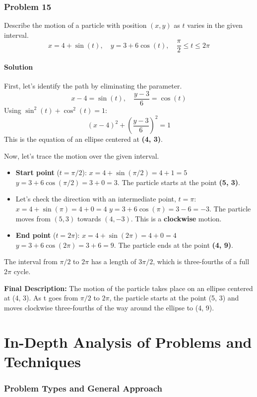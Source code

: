 \documentclass{article}
\begin{document}
\section{Problem 15}
Describe the motion of a particle with position $(x, y)$ as $t$ varies in the given interval.
\[ x = 4 + \sin(t), \quad y = 3 + 6 \cos(t), \quad \frac{\pi}{2} \le t \le 2\pi \]

\subsection*{Solution}
First, let's identify the path by eliminating the parameter.
\[ x - 4 = \sin(t), \quad \frac{y-3}{6} = \cos(t) \]
Using $\sin^2(t) + \cos^2(t) = 1$:
\[ (x-4)^2 + \left(\frac{y-3}{6}\right)^2 = 1 \]
This is the equation of an ellipse centered at \textbf{(4, 3)}.

Now, let's trace the motion over the given interval.
\begin{itemize}
    \item \textbf{Start point} ($t = \pi/2$):
    $x = 4 + \sin(\pi/2) = 4 + 1 = 5$
    $y = 3 + 6\cos(\pi/2) = 3 + 0 = 3$.
    The particle starts at the point \textbf{(5, 3)}.

    \item Let's check the direction with an intermediate point, $t=\pi$:
    $x = 4 + \sin(\pi) = 4 + 0 = 4$
    $y = 3 + 6\cos(\pi) = 3 - 6 = -3$.
    The particle moves from $(5, 3)$ towards $(4, -3)$. This is a \textbf{clockwise} motion.

    \item \textbf{End point} ($t = 2\pi$):
    $x = 4 + \sin(2\pi) = 4 + 0 = 4$
    $y = 3 + 6\cos(2\pi) = 3 + 6 = 9$.
    The particle ends at the point \textbf{(4, 9)}.
\end{itemize}
The interval from $\pi/2$ to $2\pi$ has a length of $3\pi/2$, which is three-fourths of a full $2\pi$ cycle.

\textbf{Final Description:} The motion of the particle takes place on an ellipse centered at (4, 3). As t goes from $\pi/2$ to $2\pi$, the particle starts at the point (5, 3) and moves clockwise three-fourths of the way around the ellipse to (4, 9).

\part*{In-Depth Analysis of Problems and Techniques}

\section{Problem Types and General Approach}
\end{document}
